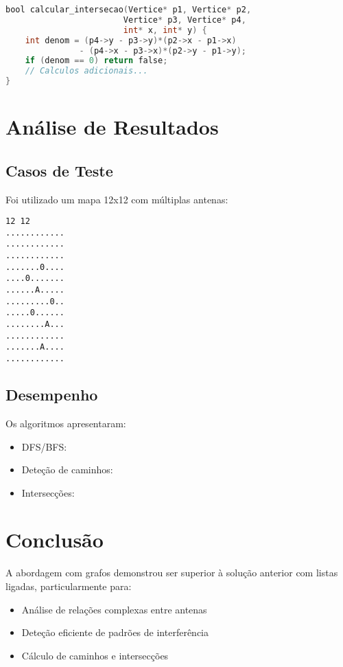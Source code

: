 \documentclass[a4paper,12pt]{report}
\begin{document}
\begin{lstlisting}[language=C]
bool calcular_intersecao(Vertice* p1, Vertice* p2, 
                        Vertice* p3, Vertice* p4, 
                        int* x, int* y) {
    int denom = (p4->y - p3->y)*(p2->x - p1->x) 
               - (p4->x - p3->x)*(p2->y - p1->y);
    if (denom == 0) return false;
    // Calculos adicionais...
}
\end{lstlisting}

\chapter{Análise de Resultados}
\section{Casos de Teste}
Foi utilizado um mapa 12x12 com múltiplas antenas:

\begin{lstlisting}[basicstyle=\ttfamily\small]
12 12
............
............
............
.......0....
....0.......
......A.....
.........0..
.....0......
........A...
............
.......A....
............
\end{lstlisting}

\section{Desempenho}
Os algoritmos apresentaram:

\begin{itemize}
    \item DFS/BFS:
    \item Deteção de caminhos:
    \item Intersecções:
\end{itemize}

\chapter{Conclusão}
A abordagem com grafos demonstrou ser superior à solução anterior com listas ligadas, particularmente para:

\begin{itemize}
    \item Análise de relações complexas entre antenas
    \item Deteção eficiente de padrões de interferência
    \item Cálculo de caminhos e intersecções
\end{itemize}
\end{document}
